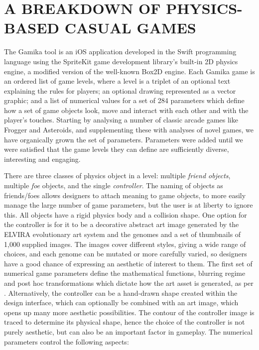 \documentclass{IEEEtran}
\begin{document}
\section{ A BREAKDOWN OF PHYSICS-BASED CASUAL GAMES}
\label{Section:3}
The Gamika tool is an iOS application developed in the Swift programming language using the SpriteKit game development library's built-in 2D physics engine, a modified version of the well-known Box2D engine. Each Gamika game is an ordered list of game levels, where a level is a triplet of an optional text explaining the rules for players; an optional drawing represented as a vector graphic; and a list of numerical values for a set of 284 parameters which define how a set of game objects look, move and interact with each other and with the player's touches. Starting by analysing a number of classic arcade games like Frogger and Asteroids, and supplementing these with analyses of novel games, we have organically grown the set of parameters. Parameters were added until we were satisfied that the game levels they can define are sufficiently diverse, interesting and engaging.

There are three classes of physics object in a level: multiple \emph{friend objects}, multiple \emph{foe} objects, and the single \emph{controller}. The naming of objects as friends/foes allows designers to attach meaning to game objects, to more easily manage the large number of game parameters, but the user is at liberty to ignore this. All objects have a rigid physics body and a collision shape. One option for the controller is for it to be a decorative abstract art image generated by the ELVIRA evolutionary art system
\cite{colton:evomusart11} and the genomes and a set of thumbnails of 1,000 supplied images. The images cover different styles, giving a wide range of choices, and each genome can be mutated or more carefully varied, so designers have a good chance of expressing an aesthetic of interest to them. The first set of numerical game parameters define the mathematical functions, blurring regime and post hoc transformations which dictate how the art asset is generated, as per \cite{colton:evomusart11}. Alternatively, the controller can be a hand-drawn shape created within the design interface, which can optionally be combined with an art image, which opens up many more aesthetic possibilities. The contour of the controller image is traced to determine its physical shape, hence the choice of the controller is not purely aesthetic, but can also be an important factor in gameplay. The numerical parameters control the following aspects:
\end{document}
